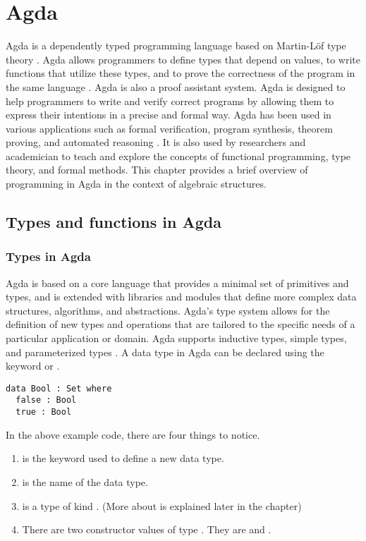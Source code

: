 \chapter{Agda}
Agda is a dependently typed programming language based on Martin-Löf type theory
\cite{AgdaDoc}. Agda allows programmers to define types that depend on values,
to write functions that utilize these types, and to prove the correctness of the
program in the same language \cite{AgdaTB}. Agda is also a proof assistant
system. Agda is designed to help programmers to write and verify correct
programs by allowing them to express their intentions in a precise and formal
way. Agda has been used in various applications such as formal verification,
program synthesis, theorem proving, and automated reasoning
\cite{2019arXiv191203028S}. It is also used by researchers and academician to
teach and explore the concepts of functional programming, type theory, and
formal methods. This chapter provides a brief overview of programming in Agda in
the context of algebraic structures. 

\section{Types and functions in Agda}
\label{types}
\subsection{Types in Agda}
Agda is based on a core language that provides a minimal set of primitives and
types, and is extended with libraries and modules that define more complex data
structures, algorithms, and abstractions. Agda's type system allows for the
definition of new types and operations that are tailored to the specific needs
of a particular application or domain. Agda supports inductive types, simple
types, and parameterized types \cite{10.1007/978-3-642-03359-9_6}. A data type
in Agda can be declared using the keyword  or . 

\begin{verbatim}
data Bool : Set where
  false : Bool 
  true : Bool
\end{verbatim}

In the above example code, there are four things to notice.
\begin{enumerate}
  \item {} is the keyword used to define a new data type. 
  \item {} is the name of the data type.
  \item {} is a type of kind . (More about  is explained later in the chapter)
  \item There are two constructor values of type . They are
   and .
\end{enumerate} 

